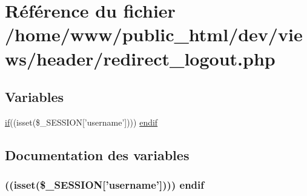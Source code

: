 \hypertarget{redirect__logout_8php}{\section{Référence du fichier /home/www/public\-\_\-html/dev/views/header/redirect\-\_\-logout.php}
\label{redirect__logout_8php}
}
\subsection*{Variables}
\begin{DoxyCompactItemize}
\item 
\hyperlink{forgot__password__result_8php_ab625f12aec73d0a4f0bc8286f088ec1f}{if}((isset(\$\-\_\-\-S\-E\-S\-S\-I\-O\-N\mbox{[}'username'\mbox{]}))) \hyperlink{redirect__logout_8php_ae70f331862ee62242185abd340ff5e34}{endif}
\end{DoxyCompactItemize}


\subsection{Documentation des variables}
\hypertarget{redirect__logout_8php_ae70f331862ee62242185abd340ff5e34}{
\subsubsection[{endif}]{ ((isset(\$\-\_\-\-S\-E\-S\-S\-I\-O\-N\mbox{[}'username'\mbox{]}))) endif}}\label{redirect__logout_8php_ae70f331862ee62242185abd340ff5e34}
